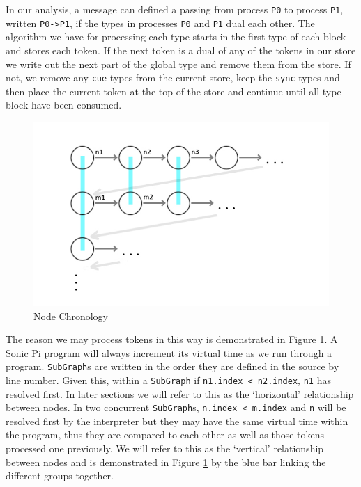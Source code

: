 \documentclass[11pt, abstracton, twoside, titlepage=true]{scrartcl}
\begin{document}
In our analysis, a message can defined a passing from process \texttt{P0}
to process \texttt{P1}, written \texttt{P0->P1}, if the types in processes 
\texttt{P0} and \texttt{P1} dual each other. The algorithm we have for processing
each type starts in the first type of each block and stores each token. If
the next token is a dual of any of the tokens in our store we write out the
next part of the global type and remove them from the store. If not, we
remove any \texttt{cue} types from the current store, keep the \texttt{sync} 
types and then place the current token at the top of the store and continue 
until all type block have been consumed.

\begin{figure}[h!]
	\centering
	\includegraphics[width=\textwidth]{images/GraphOneFix.jpg}
	\caption{Node Chronology} \label{nodegraphone}
\end{figure}

The reason we may process tokens in this way is demonstrated in Figure 
\ref{nodegraphone}. A Sonic Pi program will always increment its virtual 
time as we run through a program. \texttt{SubGraph}s are written in the order 
they are defined in the source by line number. Given this, within a 
\texttt{SubGraph} if \texttt{n1.index < n2.index}, \texttt{n1} has resolved 
first. In later sections we will refer to this as the `horizontal' relationship 
between nodes. In two concurrent \texttt{SubGraph}s, \texttt{n.index < m.index} 
and \texttt{n} will be resolved first by the interpreter but they may have the 
same virtual time within the program, thus they are compared to each other as 
well as those tokens processed one previously. We will refer to this as the 
`vertical' relationship between nodes and is demonstrated in Figure 
\ref{nodegraphone} by the blue bar linking the different groups together.
\end{document}
